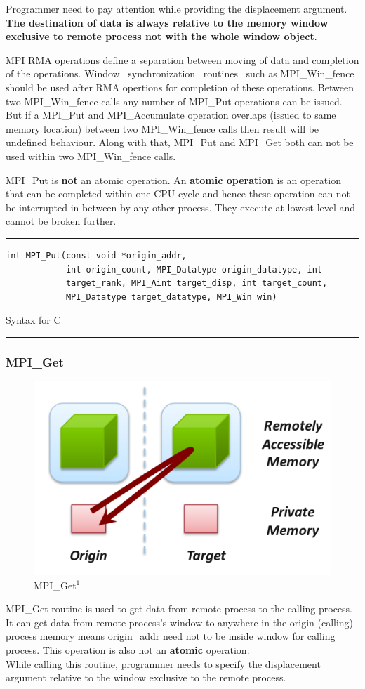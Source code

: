 Programmer need to pay attention while providing the {\ttfamily displacement} argument. \textbf{The destination of data is always relative
to the memory window exclusive to {\ttfamily remote} process not with the whole window object}.

MPI RMA operations define a separation between moving of data and completion of the operations. Window ~synchronization ~routines ~such as
{\ttfamily MPI\_Win\_fence} should be used after RMA opertions for completion of these operations. Between two {\ttfamily MPI\_Win\_fence} calls
any number of {\ttfamily MPI\_Put} operations can be issued. But if a {\ttfamily MPI\_Put} and {\ttfamily MPI\_Accumulate} operation overlaps (issued 
to same memory location) between two {\ttfamily MPI\_Win\_fence} calls then result will be {\ttfamily undefined behaviour.} Along with that,
{\ttfamily MPI\_Put} and {\ttfamily MPI\_Get} both can not be used within two {\ttfamily MPI\_Win\_fence} calls.

{\ttfamily MPI\_Put} is \textbf{not} an atomic operation. An \textbf{atomic operation} is an operation that can be completed within one CPU cycle and
hence these operation can not be interrupted in between by any other process. They execute at lowest level and cannot be broken further.
\begin{listing}[!ht]
\hrule \vspace{5pt}
\begin{verbatim}
int MPI_Put(const void *origin_addr,
            int origin_count, MPI_Datatype origin_datatype, int
            target_rank, MPI_Aint target_disp, int target_count,
            MPI_Datatype target_datatype, MPI_Win win)
\end{verbatim}
\caption{Syntax for C}
\hrule
\end{listing}

\subsubsection{{\ttfamily \large MPI\_Get}}
\begin{figure}[!ht]
    \centering
    \includegraphics[width=0.35\linewidth]{attachments/get_rma.png}
    \caption{MPI\_Get$^1$}
\end{figure}
{\ttfamily MPI\_Get} routine is used to get data from remote process to the calling process. It can get data from remote process's window to anywhere 
in the origin (calling) process memory means {\ttfamily origin\_addr} need not to be inside window for calling process. This operation is also not an
\textbf{atomic} operation.\\
While calling this routine, programmer needs to specify the {\ttfamily displacement} argument relative to the window exclusive to the remote process.

